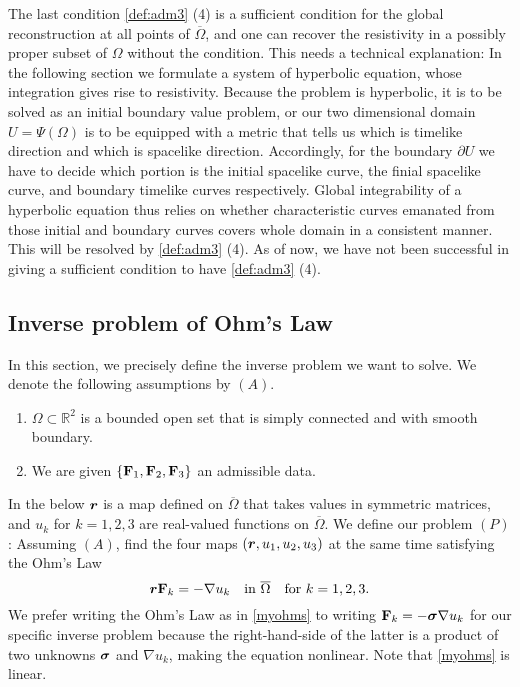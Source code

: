 \documentclass[11pt]{amsart}
\theoremstyle{plain}
\theoremstyle{remark}
\numberwithin{equation}{section}
\numberwithin{Thm}{section}
\def\F{{\bf F}}
\def\r{{\bf r}}
\def\Sigma{\mbox{\boldmath$\sigma$}}
\def\r{\mbox{\boldmath$r$}}
\begin{document}
The last condition \ref{def:adm3} (4) is a sufficient condition for the global reconstruction at all points of $\overline\Omega$, and one can recover the resistivity in a possibly proper subset of $\Omega$ without the condition. This needs a technical explanation: In the following section we formulate a system of hyperbolic equation, whose integration gives rise to resistivity. Because the problem is hyperbolic, it is to be solved as an initial boundary value problem, or our two dimensional domain $U=\Psi(\Omega)$ is to be equipped with a metric that tells us which is timelike direction and which is spacelike direction. Accordingly, for the boundary $\partial U$ we have to  decide which portion is the initial spacelike curve, the finial spacelike curve, and boundary timelike curves respectively. Global integrability of a hyperbolic equation thus relies on whether characteristic curves emanated from those initial and boundary curves covers whole domain in a consistent manner. This will be resolved by \ref{def:adm3} (4). As of now, we have not been successful in giving a sufficient condition to have \ref{def:adm3} (4).

\subsection{Inverse problem of Ohm's Law} \label{sec:inv}
In this section, we precisely define the inverse problem we want to solve. We denote the following assumptions by $(A)$.
\begin{enumerate} 
 \item $\Omega \subset \mathbb{R}^2$ is a bounded open set that is simply connected and with smooth boundary.
 \item We are given $\{\F_1, \F_2, \F_3\}$ an admissible data.
\end{enumerate}
In the below $\r$ is a map defined on $\overline\Omega$ that takes values in symmetric matrices, and $u_k$ for $k=1,2,3$ are real-valued functions on $\overline\Omega$. We define our problem $(P)$: Assuming $(A)$, find the four maps $(\r,u_1,u_2,u_3)$ at the same time satisfying the Ohm's Law 
\begin{equation}
\r\F_k = -\nabla u_k \quad \text{in $\overline\Omega$} \quad \text{for $k=1,2,3$}. \label{myohms} 
\end{equation}
We prefer writing the Ohm's Law as in \eqref{myohms} to writing $\F_k = -\Sigma\nabla u_k$ for our specific inverse problem because the right-hand-side of the latter is a product of two unknowns $\Sigma$ and $\nabla u_k$, making the equation nonlinear. Note that \eqref{myohms} is linear.
\end{document}
